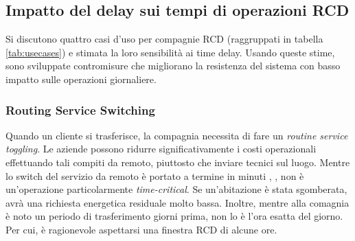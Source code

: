 \subsection{Impatto del delay sui tempi di operazioni RCD}
Si discutono quattro casi d'uso per compagnie RCD (raggruppati in tabella \ref{tab:usecases}) e stimata la loro sensibilità ai time delay. Usando queste stime, sono sviluppate contromisure che migliorano la resistenza del sistema con basso impatto sulle operazioni giornaliere.\\
\subsubsection{Routing Service Switching}
Quando un cliente si trasferisce, la compagnia necessita di fare un \emph{routine service toggling}. Le aziende possono ridurre significativamente i costi operazionali effettuando tali compiti da remoto, piuttosto che inviare tecnici sul luogo. Mentre lo switch del servizio da remoto è portato a termine in minuti \cite{toggle1}, \cite{toggle2}, non è un'operazione particolarmente \emph{time-critical}. Se un'abitazione è stata sgomberata, avrà una richiesta energetica residuale molto bassa. Inoltre, mentre alla comagnia è noto un periodo di trasferimento giorni prima, non lo è l'ora esatta del giorno. Per cui, è ragionevole aspettarsi una finestra RCD di alcune ore.
